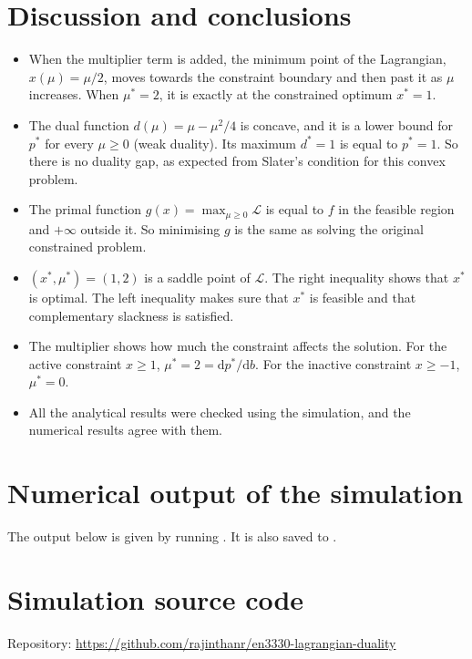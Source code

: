 \documentclass[11pt,a4paper]{article}
\newcommand{\codeurl}{https://github.com/rajinthanr/en3330-lagrangian-duality}
\newcommand{\Lag}{\mathcal{L}}
\begin{document}
\section{Discussion and conclusions}

\begin{itemize}
  \item When the multiplier term is added, the minimum point of the
        Lagrangian, $x(\mu)=\mu/2$, moves towards the constraint boundary
        and then past it as $\mu$ increases. When $\mu^*=2$, it is exactly at
        the constrained optimum $x^*=1$.
  \item The dual function $d(\mu)=\mu-\mu^2/4$ is concave, and it is a lower
        bound for $p^*$ for every $\mu\ge 0$ (weak duality). Its maximum
        $d^*=1$ is equal to $p^*=1$. So there is no duality gap, as expected
        from Slater's condition for this convex problem.
  \item The primal function $g(x)=\max_{\mu\ge0}\Lag$ is equal to $f$ in the
        feasible region and $+\infty$ outside it. So minimising $g$ is the same
        as solving the original constrained problem.
  \item $(x^*,\mu^*)=(1,2)$ is a saddle point of $\Lag$. The right inequality
        shows that $x^*$ is optimal. The left inequality makes sure that $x^*$
        is feasible and that complementary slackness is satisfied.
  \item The multiplier shows how much the constraint affects the solution.
        For the active constraint $x\ge1$, $\mu^*=2=\mathrm{d}p^*/\mathrm{d}b$.
        For the inactive constraint $x\ge-1$, $\mu^*=0$.
  \item All the analytical results were checked using the simulation, and the
        numerical results agree with them.
\end{itemize}

\appendix
\section{Numerical output of the simulation}\label{app:log}
The output below is given by running .
It is also saved to .



\section{Simulation source code}\label{app:code}
Repository: \url{\codeurl}


\end{document}

